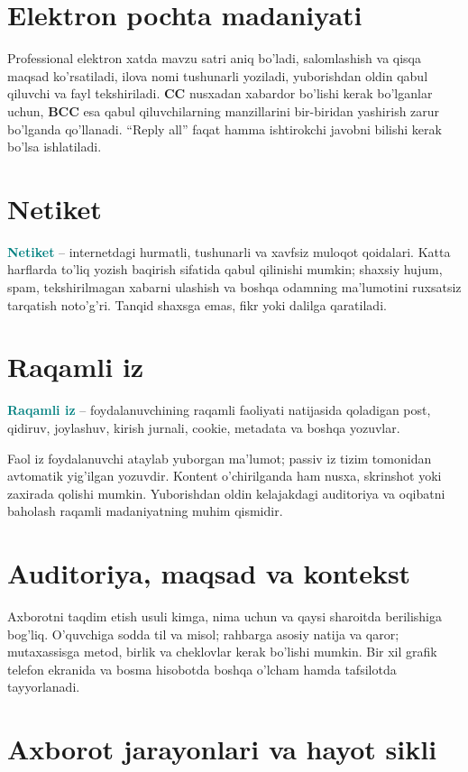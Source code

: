 \documentclass[11pt,a4paper,oneside]{book}
\newcommand{\term}[1]{\textbf{\textcolor{Teal}{#1}}\index{#1}}
\begin{document}
\section{Elektron pochta madaniyati}
Professional elektron xatda mavzu satri aniq bo'ladi, salomlashish va qisqa maqsad ko'rsatiladi, ilova nomi tushunarli yoziladi, yuborishdan oldin qabul qiluvchi va fayl tekshiriladi. \textbf{CC} nusxadan xabardor bo'lishi kerak bo'lganlar uchun, \textbf{BCC} esa qabul qiluvchilarning manzillarini bir-biridan yashirish zarur bo'lganda qo'llanadi. ``Reply all'' faqat hamma ishtirokchi javobni bilishi kerak bo'lsa ishlatiladi.

\section{Netiket}
\term{Netiket} -- internetdagi hurmatli, tushunarli va xavfsiz muloqot qoidalari. Katta harflarda to'liq yozish baqirish sifatida qabul qilinishi mumkin; shaxsiy hujum, spam, tekshirilmagan xabarni ulashish va boshqa odamning ma'lumotini ruxsatsiz tarqatish noto'g'ri. Tanqid shaxsga emas, fikr yoki dalilga qaratiladi.

\section{Raqamli iz}
\begin{definition}
\term{Raqamli iz} -- foydalanuvchining raqamli faoliyati natijasida qoladigan post, qidiruv, joylashuv, kirish jurnali, cookie, metadata va boshqa yozuvlar.
\end{definition}
Faol iz foydalanuvchi ataylab yuborgan ma'lumot; passiv iz tizim tomonidan avtomatik yig'ilgan yozuvdir. Kontent o'chirilganda ham nusxa, skrinshot yoki zaxirada qolishi mumkin. Yuborishdan oldin kelajakdagi auditoriya va oqibatni baholash raqamli madaniyatning muhim qismidir.

\section{Auditoriya, maqsad va kontekst}
Axborotni taqdim etish usuli kimga, nima uchun va qaysi sharoitda berilishiga bog'liq. O'quvchiga sodda til va misol; rahbarga asosiy natija va qaror; mutaxassisga metod, birlik va cheklovlar kerak bo'lishi mumkin. Bir xil grafik telefon ekranida va bosma hisobotda boshqa o'lcham hamda tafsilotda tayyorlanadi.

\section{Axborot jarayonlari va hayot sikli}
\end{document}
